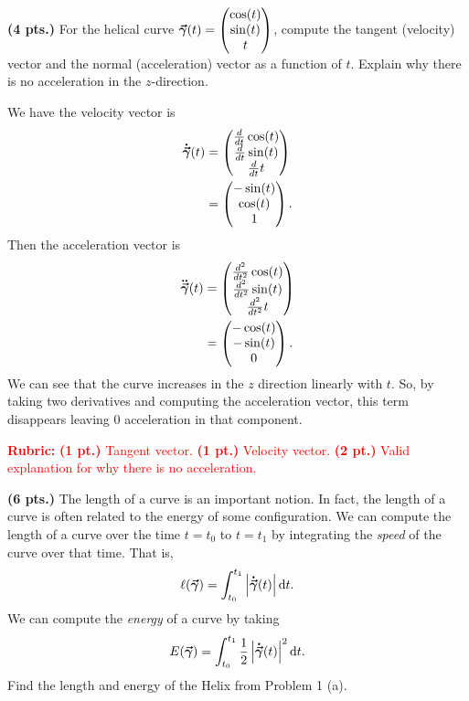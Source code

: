 \documentclass[12pt]{article} %
\begin{document}
\begin{problem}
\textbf{(4 pts.)} For the helical curve $\boldsymbol{\vec{\gamma}}(t) = \begin{pmatrix} \cos(t) \\ \sin(t) \\ t \end{pmatrix}$, compute the tangent (velocity) vector and the normal (acceleration) vector as a function of $t$. Explain why there is no acceleration in the $z$-direction.
\end{problem}
\begin{solution}
We have the velocity vector is
\begin{align*}
\boldsymbol{\dot{\vec{\gamma}}}(t) &= \begin{pmatrix} \frac{d}{dt}\cos(t) \\ \frac{d}{dt}\sin(t) \\ \frac{d}{dt}t \end{pmatrix}\\
&= \begin{pmatrix} -\sin(t) \\ \cos(t) \\ 1 \end{pmatrix}.
\end{align*}
Then the acceleration vector is
\begin{align*}
\boldsymbol{\ddot{\vec{\gamma}}}(t) &= \begin{pmatrix} \frac{d^2}{dt^2}\cos(t) \\ \frac{d^2}{dt^2}\sin(t) \\ \frac{d^2}{dt^2}t \end{pmatrix}\\
&= \begin{pmatrix} -\cos(t) \\ -\sin(t) \\ 0 \end{pmatrix}.
\end{align*}
We can see that the curve increases in the $z$ direction linearly with $t$. So, by taking two derivatives and computing the acceleration vector, this term disappears leaving 0 acceleration in that component.
\end{solution}
\textcolor{red}{
\noindent \textbf{Rubric:}}
\textcolor{red}{
\textbf{(1 pt.)} Tangent vector. \textbf{(1 pt.)} Velocity vector.  \textbf{(2 pt.)} Valid explanation for why there is no acceleration.
}
\newpage

\begin{problem}
\textbf{(6 pts.)} The length of a curve is an important notion. In fact, the length of a curve is often related to the energy of some configuration. We can compute the length of a curve over the time $t=t_0$ to $t=t_1$ by integrating the \emph{speed} of the curve over that time.  That is,
\[
\ell(\boldsymbol{\vec{\gamma}}) = \int_{t_0}^{t_1} \left|\boldsymbol{\dot{\vec{\gamma}}}(t)\right| \mathop{}\!\mathrm{d} t.
\]
We can compute the \emph{energy} of a curve by taking
\[
E(\boldsymbol{\vec{\gamma}}) = \int_{t_0}^{t_1} \frac{1}{2} \left| \boldsymbol{\dot{\vec{\gamma}}}(t)\right|^2 \mathop{}\!\mathrm{d} t.
\]
Find the length and energy of the Helix from Problem 1 (a).
\end{problem}
\end{document}
